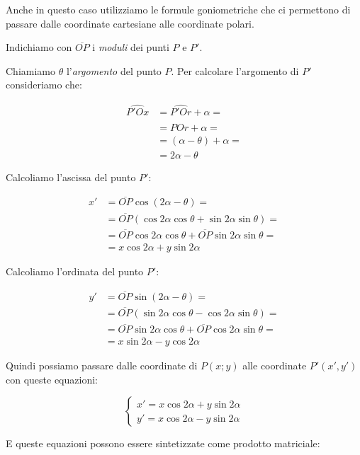 Anche in questo caso utilizziamo le formule goniometriche che ci permettono di passare dalle coordinate cartesiane alle coordinate polari.

Indichiamo con $\overline{OP}$ i \emph{moduli} dei punti $P$ e $P'$.

Chiamiamo $\theta$ l'\emph{argomento} del punto $P$. Per calcolare l'argomento di $P'$ consideriamo che:

\begin{align}
	\widehat{P'Ox} & = \widehat{P'Or} + \alpha = \\
	& = \widehat{POr} + \alpha = \\
	& = (\alpha - \theta) + \alpha = \\
	& = 2\alpha - \theta
\end{align}

Calcoliamo l'ascissa del punto $P'$:

\begin{align}
	x' & = \overline{OP} \cos (2\alpha - \theta) = \\
	& = \overline{OP} ( \cos 2\alpha \cos \theta + \sin 2\alpha \sin \theta) = \\
	& = \overline{OP} \cos 2\alpha \cos \theta + \overline{OP} \sin 2\alpha \sin \theta = \\
	& = x \cos 2\alpha + y \sin 2\alpha
\end{align}

Calcoliamo l'ordinata del punto $P'$:

\begin{align}
	y' & = \overline{OP} \sin (2\alpha - \theta) = \\
	& = \overline{OP} ( \sin 2\alpha \cos \theta - \cos 2\alpha \sin \theta) = \\
	& = \overline{OP}  \sin 2\alpha \cos \theta + \overline{OP} \cos 2\alpha \sin \theta = \\
	& = x \sin 2\alpha - y \cos 2\alpha
\end{align}

Quindi possiamo passare dalle coordinate di $P(x; y)$ alle coordinate $P'(x', y')$ con queste equazioni:

\begin{equation}
	\begin{cases}
		x' = x \cos 2\alpha + y \sin 2\alpha \\
		y' = x \cos 2\alpha - y \sin 2\alpha
	\end{cases}
\end{equation}

E queste equazioni possono essere sintetizzate come prodotto matriciale:

